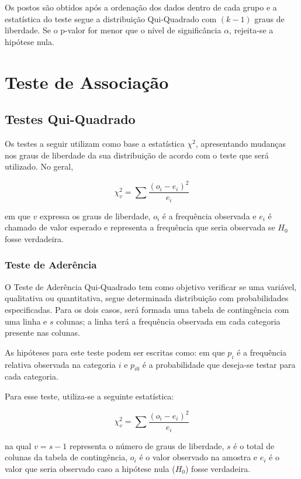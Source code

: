 \documentclass[
]{estat/estat}
\begin{document}
Os postos são obtidos após a ordenação dos dados dentro de cada grupo e
a estatística do teste segue a distribuição Qui-Quadrado com \((k-1)\)
graus de liberdade. Se o p-valor for menor que o nível de significância
\(\alpha\), rejeita-se a hipótese nula.

\section{Teste de Associação}\label{teste-de-associauxe7uxe3o}

\subsection{Testes Qui-Quadrado}\label{testes-qui-quadrado}

Os testes a seguir utilizam como base a estatística \(\chi^{2}\),
apresentando mudanças nos graus de liberdade da sua distribuição de
acordo com o teste que será utilizado. No geral,

\[ \chi_{v}^{2} = \sum \frac{(o_{i} - e_{i})^{2}}{e_{i}} \]

em que \(v\) expressa os graus de liberdade, \(o_{i}\) é a frequência
observada e \(e_{i}\) é chamado de valor esperado e representa a
frequência que seria observada se \(H_{0}\) fosse verdadeira.

\subsubsection{Teste de Aderência}\label{teste-de-aderuxeancia}

O Teste de Aderência Qui-Quadrado tem como objetivo verificar se uma
variável, qualitativa ou quantitativa, segue determinada distribuição
com probabilidades especificadas. Para os dois casos, será formada uma
tabela de contingência com uma linha e \(s\) colunas; a linha terá a
frequência observada em cada categoria presente nas colunas.

As hipóteses para este teste podem ser escritas como:
 em que \(p_{i}\) é a
frequência relativa observada na categoria \(i\) e \(p_{i0}\) é a
probabilidade que deseja-se testar para cada categoria.

Para esse teste, utiliza-se a seguinte estatística:

\[ \chi_{v}^{2} = \sum \frac{(o_{i} - e_{i})^{2}}{e_{i}} \]

na qual \(v = s - 1\) representa o número de graus de liberdade, \(s\) é
o total de colunas da tabela de contingência, \(o_{i}\) é o valor
observado na amostra e \(e_{i}\) é o valor que seria observado caso a
hipótese nula (\(H_0\)) fosse verdadeira.
\end{document}
